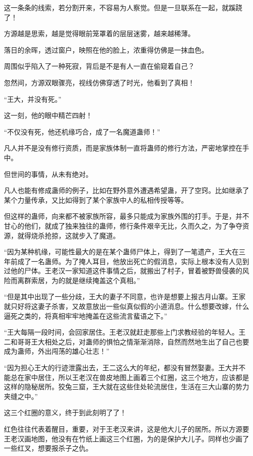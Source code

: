 \begin{this_body}
这一条条的线索，若分割开来，不容易为人察觉。但是一旦联系在一起，就蹊跷了！

方源越是思索，越是觉得眼前笼罩着的层层迷雾，越来越稀薄。

落日的余晖，透过窗户，映照在他的脸上，浓重得仿佛是一抹血色。

周围似乎陷入了一种死寂，背后是不是有人一直在偷窥着自己？

忽然间，方源双眼骤亮，视线仿佛穿透了时光，他看到了真相！

“王大，并没有死。”

这一刻，他的眼中精芒四射！

“不仅没有死，他还机缘巧合，成了一名魔道蛊师！”

凡人并不是没有修行资质，而是家族体制一直将蛊师的修行方法，严密地掌控在手中。

但世间的事情，从未有绝对。

凡人也能有修成蛊师的例子，比如在野外意外遭遇希望蛊，开了空窍。比如继承了某个力量传承，又比如得到了某个家族中人的私相传授等等。

但这样的蛊师，向来都不被家族所容，最多只能成为家族外围的打手。于是，并不甘心的他们，就成了独来独往的蛊师，修行条件艰辛无比，久而久之，为了争夺资源，就得烧杀抢掠，这就步入了魔道。

“因为某种机缘，可能性最大的是在某个蛊师尸体上，得到了一笔遗产，王大在三年前成了一名蛊师。为了掩人耳目，他放出死亡的假消息，实际上根本没有人见到过他的尸体。王老汉一家知道这件事情之后，就搬出了村子，冒着被野兽侵袭的风险而离群索居，为的就是继续掩盖这个真相。”

“但是其中出现了一些分歧，王大的妻子不同意，也许是想要上报古月山寨。王家就只好将这妻子杀害，又故意放出一些似真似假的小道消息。什么想要改嫁，什么逼死之类的，将真相牢牢地掩盖在这些流言蜚语之下。”

“王大每隔一段时间，会回家居住。王老汉就赶走那些上门求教经验的年轻人。王二和哥哥王大相处之后，对蛊师的惧怕之情渐渐消除，自然而然地生出了自己也要成为蛊师，外出闯荡的雄心壮志！”

“因为担心王大的行迹泄露出去，王二这么大的年纪，都没有冒然娶妻。王大并不能总在家中居住，所以王老汉在兽皮地图上画着三个红圈，这三个地方，应该都是这样的隐秘居所。狡兔三窟，王大就在这些住处轮流居住，生活在三大山寨的势力夹缝之中。”

这三个红圈的意义，终于到此刻明了了！

红色往往代表着醒目，重要，对于王老汉来讲，这是他大儿子的居所。所以方源要王老汉画地图，他没有在竹纸上画这三个红圈，为的是保护大儿子。同样也少画了一些红叉，想要报杀子之仇。


\end{this_body}
